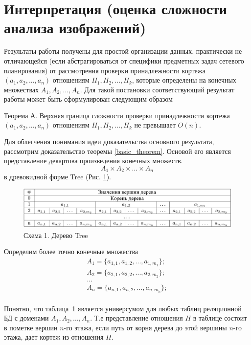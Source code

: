 \section{Интерпретация (оценка сложности анализа изображений)}
Результаты  работы \cite{Samara} получены для простой организации данных, практически не отличающейся (если абстрагироваться от специфики предметных задач сетевого планирования) от рассмотрения проверки принадлежности кортежа $(a_1,  a_2, ..., a_n)$   отношениям $H_1, H_2, ... , H_k$,  которые определены на конечных множествах $A_1,  A_2, ..., A_n$.
Для такой постановки соответствующий результат работы \cite{Samara}   может быть сформулирован следующим образом
\begin{theorem}
Теорема А.  Верхняя граница сложности проверки принадлежности кортежа 
$(a_1,  a_2, ..., a_n)$  отношениям $H_1, H_2, ... , H_k$  не превышает  $O(n)$.
\label{basic_theorem}
\end{theorem}
Для облегчения понимания идеи доказательства основного результата, рассмотрим доказательство теоремы \ref{basic_theorem}. Основой его является представление декартова произведения конечных множеств.
$$A_1 \times A_2 \times \ldots \times A_n$$
в древовидной форме Tree (Рис. \ref{tree}).

\begin{figure}[b]
\includegraphics[width=\linewidth,keepaspectratio]{images/an_tbl1}
\caption{Схема 1. Дерево Tree}
\label{tree}
\end{figure}


Определим более точно конечные множества 
\begin{equation}
\begin{array}{c}
A_1 = \{a_{1,1}, a_{1,2}, ..., a_{1,m_1}\}; \\
A_2 = \{ a_{2,1}, a_{2,2}, ..., a_{2,m_2}\}; \\
\dots \\
A_n = \{ a_{n,1}, a_{n,2}, ..., a_{n,m_n}\}; \\
\end{array}
\end{equation}


Понятно, что таблица~1 является универсумом для любых таблиц реляционной БД с доменами $A_1, A_2,\ldots,A_n$. Т.е представление отношения $H$ в таблице состоит в пометке вершин $n$-го этажа, если путь от корня дерева до этой вершины $n$-го этажа, дает кортеж из отношения $H$.

